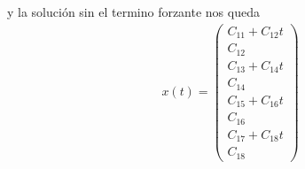 \documentclass{uofa-eng-assignment}
\begin{document}
y la solución sin el termino forzante nos queda 
\begin{align*}
    x(t) = \left(\begin{matrix}
        C_{11} + C_{12} t \\
        C_{12} \\
        C_{13} + C_{14} t \\
        C_{14} \\     
        C_{15} + C_{16} t \\
        C_{16} \\
        C_{17} + C_{18} t \\
        C_{18}
    \end{matrix}\right)
\end{align*}
\end{document}
